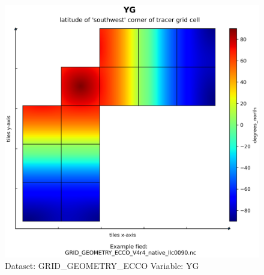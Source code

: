 \begin{figure}[H]
\centering
\includegraphics[scale=0.55]{../images/plots/native_plots_coords/Geometry_Parameters_for_the_Lat-Lon-Cap_90_(llc90)_Native_Model_Grid_(Version_4_Release_4)/YG.png}
\caption{Dataset: GRID\_GEOMETRY\_ECCO Variable: YG}
\label{tab:table-GRID_GEOMETRY_ECCO_YG-Plot}
\end{figure}
\pagebreak

